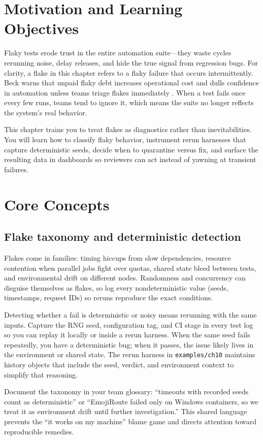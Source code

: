 \section{Motivation and Learning Objectives}
Flaky tests erode trust in the entire automation suite—they waste cycles rerunning noise, delay releases, and hide the true signal from regression bugs. For clarity, a flake in this chapter refers to a flaky failure that occurs intermittently. Beck warns that unpaid flaky debt increases operational cost and dulls confidence in automation unless teams triage flakes immediately \citep{beck2020flaky}. When a test fails once every few runs, teams tend to ignore it, which means the suite no longer reflects the system’s real behavior.

This chapter trains you to treat flakes as diagnostics rather than inevitabilities. You will learn how to classify flaky behavior, instrument rerun harnesses that capture deterministic seeds, decide when to quarantine versus fix, and surface the resulting data in dashboards so reviewers can act instead of yawning at transient failures.

\section{Core Concepts}
\subsection{Flake taxonomy and deterministic detection}
Flakes come in families: timing hiccups from slow dependencies, resource contention when parallel jobs fight over quotas, shared state bleed between tests, and environmental drift on different nodes. Randomness and concurrency can disguise themselves as flakes, so log every nondeterministic value (seeds, timestamps, request IDs) so reruns reproduce the exact conditions.

Detecting whether a fail is deterministic or noisy means rerunning with the same inputs. Capture the RNG seed, configuration tag, and CI stage in every test log so you can replay it locally or inside a rerun harness. When the same seed fails repeatedly, you have a deterministic bug; when it passes, the issue likely lives in the environment or shared state. The rerun harness in \texttt{examples/ch10} maintains history objects that include the seed, verdict, and environment context to simplify that reasoning.

Document the taxonomy in your team glossary: ``timeouts with recorded seeds count as deterministic'' or ``EmojiRoute failed only on Windows containers, so we treat it as environment drift until further investigation.'' This shared language prevents the ``it works on my machine'' blame game and directs attention toward reproducible remedies.

